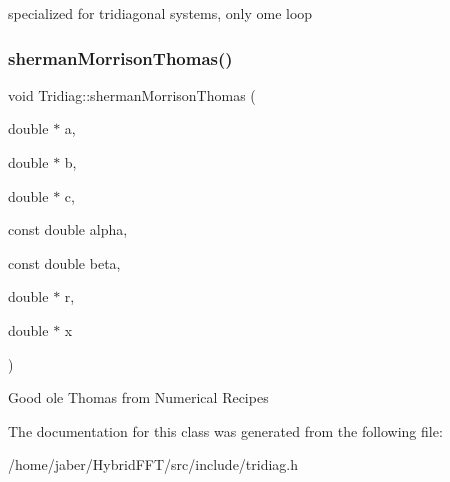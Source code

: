 specialized for tridiagonal systems, only ome loop \mbox{\label{classTridiag_a9297b674ba991225e47ac01ceac59e0a}} 
\subsubsection{\texorpdfstring{sherman\+Morrison\+Thomas()}{shermanMorrisonThomas()}}
{\footnotesize\ttfamily void Tridiag\+::sherman\+Morrison\+Thomas (\begin{DoxyParamCaption}\item[{double $\ast$}]{a,  }\item[{double $\ast$}]{b,  }\item[{double $\ast$}]{c,  }\item[{const double}]{alpha,  }\item[{const double}]{beta,  }\item[{double $\ast$}]{r,  }\item[{double $\ast$}]{x }\end{DoxyParamCaption})}

Good ole Thomas from Numerical Recipes 

The documentation for this class was generated from the following file\+:\begin{DoxyCompactItemize}
\item 
/home/jaber/\+Hybrid\+F\+F\+T/src/include/tridiag.\+h\end{DoxyCompactItemize}
